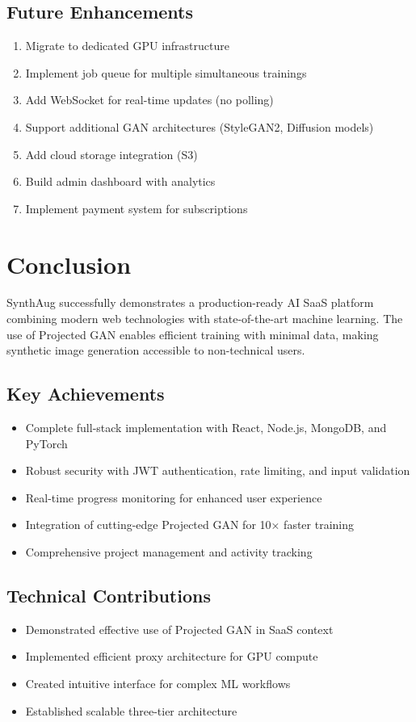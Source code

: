 \documentclass[11pt,a4paper]{article}
\begin{document}
\subsection{Future Enhancements}

\begin{enumerate}[noitemsep]
    \item Migrate to dedicated GPU infrastructure
    \item Implement job queue for multiple simultaneous trainings
    \item Add WebSocket for real-time updates (no polling)
    \item Support additional GAN architectures (StyleGAN2, Diffusion models)
    \item Add cloud storage integration (S3)
    \item Build admin dashboard with analytics
    \item Implement payment system for subscriptions
\end{enumerate}

\section{Conclusion}

SynthAug successfully demonstrates a production-ready AI SaaS platform combining modern web technologies with state-of-the-art machine learning. The use of Projected GAN enables efficient training with minimal data, making synthetic image generation accessible to non-technical users.

\subsection{Key Achievements}
\begin{itemize}[noitemsep]
    \item Complete full-stack implementation with React, Node.js, MongoDB, and PyTorch
    \item Robust security with JWT authentication, rate limiting, and input validation
    \item Real-time progress monitoring for enhanced user experience
    \item Integration of cutting-edge Projected GAN for 10× faster training
    \item Comprehensive project management and activity tracking
\end{itemize}

\subsection{Technical Contributions}
\begin{itemize}[noitemsep]
    \item Demonstrated effective use of Projected GAN in SaaS context
    \item Implemented efficient proxy architecture for GPU compute
    \item Created intuitive interface for complex ML workflows
    \item Established scalable three-tier architecture
\end{itemize}
\end{document}
